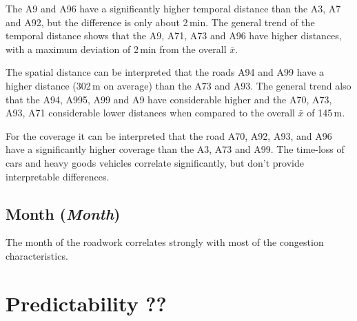 The A9 and A96 have a significantly higher temporal distance than the A3, A7 and A92, but the difference is only about 2\,min. The general trend of the temporal distance shows that the A9, A71, A73 and A96 have higher distances, with a maximum deviation of 2\,min from the overall $\bar{x}$.

The spatial distance can be interpreted that the roads A94 and A99 have a higher distance (302\,m on average) than the A73 and A93. The general trend also that the A94, A995, A99 and A9 have considerable higher and the A70, A73, A93, A71 considerable lower distances when compared to the overall $\bar{x}$ of 145\,m.

For the coverage it can be interpreted that the road A70, A92, A93, and A96 have a significantly higher coverage than the A3, A73 and A99. The time-loss of cars and heavy goods vehicles correlate significantly, but don't provide interpretable differences.

\subsection{Month (\textit{Month})}
The month of the roadwork correlates strongly with most of the congestion characteristics.

\section{Predictability ??}

